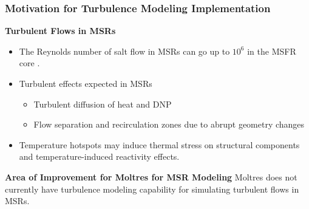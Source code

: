 \begin{frame}
  \frametitle{Motivation for Turbulence Modeling Implementation}
  \textbf{Turbulent Flows in MSRs}
  \begin{itemize}
    \item The Reynolds number of salt flow in MSRs can go up to $10^6$ in the MSFR core
      \cite{fiorina_modelling_2014}.
    \item Turbulent effects expected in MSRs
    \begin{itemize}
      \item Turbulent diffusion of heat and \gls{DNP}
      \item Flow separation and recirculation zones due to abrupt geometry changes
    \end{itemize}
    \item Temperature hotspots may induce thermal stress on structural
      components and temperature-induced reactivity effects.
  \end{itemize}
  \pause
  \begin{block}{\textbf{Area of Improvement for Moltres for MSR Modeling}}
    Moltres does not currently have turbulence modeling capability for simulating
    turbulent flows in MSRs.
  \end{block}
\end{frame}
